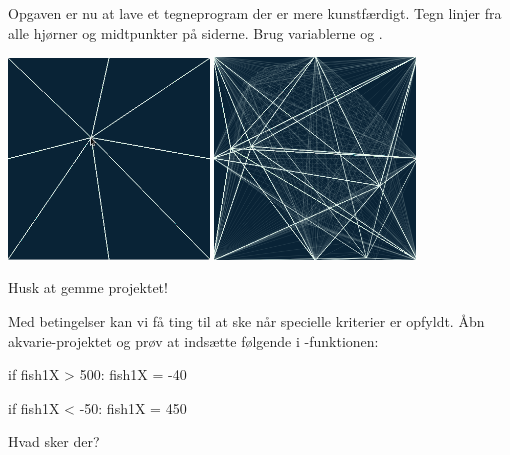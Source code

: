 \documentclass{ucph-handout}
\newcounter{handout}
\begin{document}
\begin{exercisebox}[adjusted title=Nyt projekt: Kreativt tegneprogram ]
Opgaven er nu at lave et tegneprogram der er mere kunstfærdigt. Tegn
linjer fra alle hjørner og midtpunkter på siderne. Brug
variablerne  og .
\begin{center}
  \includegraphics[width=0.40\textwidth]{illustrationer/kryds.png}
  \quad
  \includegraphics[width=0.40\textwidth]{illustrationer/kryds-tegning.png}
\end{center}
Husk at gemme projektet!
\end{exercisebox}

\newpage
{}
\begin{exercisebox}[adjusted title= Betingelser]
Med betingelser kan vi få ting til at ske når specielle kriterier er
opfyldt. Åbn akvarie-projektet og prøv at indsætte følgende i
-funktionen:
\begin{python}
if fish1X > 500:
    fish1X = -40
        
if fish1X < -50:
    fish1X = 450
\end{python}
\noindent
Hvad sker der?
\end{exercisebox}
\end{document}
